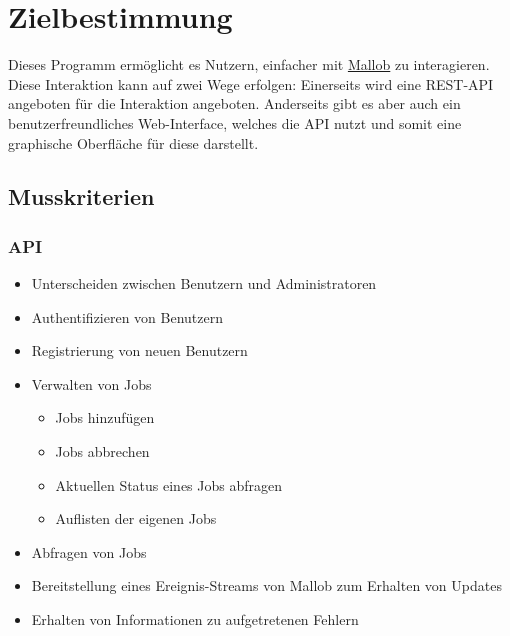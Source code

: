 \section{Zielbestimmung}
Dieses Programm ermöglicht es Nutzern, einfacher mit \href{https://github.com/domschrei/mallob}{Mallob} zu interagieren. Diese Interaktion kann auf zwei Wege erfolgen:
Einerseits wird eine REST-API angeboten für die Interaktion angeboten. Anderseits gibt es aber auch ein benutzerfreundliches Web-Interface, welches die API nutzt und somit eine graphische Oberfläche für diese darstellt.
\subsection{Musskriterien}
    \subsubsection{API}
        \begin{itemize}
            \item Unterscheiden zwischen Benutzern und Administratoren
            \item Authentifizieren von Benutzern
            \item Registrierung von neuen Benutzern
            \item Verwalten von Jobs
                \begin{itemize}
                    \item Jobs hinzufügen
                    \item Jobs abbrechen
                    \item Aktuellen Status eines Jobs abfragen
                    \item Auflisten der eigenen Jobs
                \end{itemize}
            \item Abfragen von Jobs
            \item Bereitstellung eines Ereignis-Streams von Mallob zum Erhalten von Updates
            \item Erhalten von Informationen zu aufgetretenen Fehlern
        \end{itemize}
